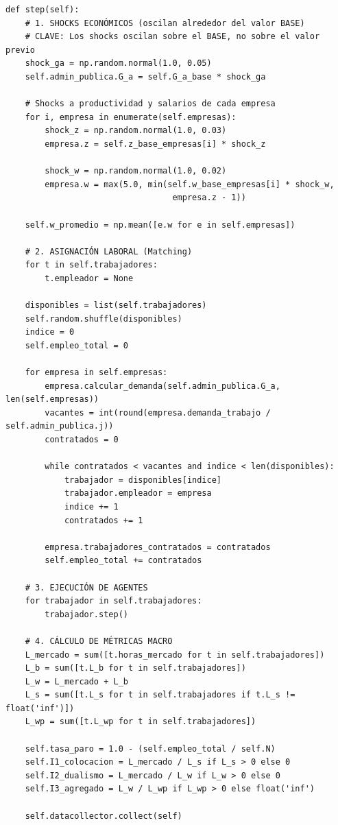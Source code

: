 \begin{verbatim}
def step(self):
    # 1. SHOCKS ECONÓMICOS (oscilan alrededor del valor BASE)
    # CLAVE: Los shocks oscilan sobre el BASE, no sobre el valor previo
    shock_ga = np.random.normal(1.0, 0.05)
    self.admin_publica.G_a = self.G_a_base * shock_ga
    
    # Shocks a productividad y salarios de cada empresa
    for i, empresa in enumerate(self.empresas):
        shock_z = np.random.normal(1.0, 0.03)
        empresa.z = self.z_base_empresas[i] * shock_z
        
        shock_w = np.random.normal(1.0, 0.02)
        empresa.w = max(5.0, min(self.w_base_empresas[i] * shock_w, 
                                  empresa.z - 1))
    
    self.w_promedio = np.mean([e.w for e in self.empresas])

    # 2. ASIGNACIÓN LABORAL (Matching)
    for t in self.trabajadores: 
        t.empleador = None
        
    disponibles = list(self.trabajadores)
    self.random.shuffle(disponibles)
    indice = 0
    self.empleo_total = 0
    
    for empresa in self.empresas:
        empresa.calcular_demanda(self.admin_publica.G_a, len(self.empresas))
        vacantes = int(round(empresa.demanda_trabajo / self.admin_publica.j))
        contratados = 0
        
        while contratados < vacantes and indice < len(disponibles):
            trabajador = disponibles[indice]
            trabajador.empleador = empresa
            indice += 1
            contratados += 1
            
        empresa.trabajadores_contratados = contratados
        self.empleo_total += contratados

    # 3. EJECUCIÓN DE AGENTES
    for trabajador in self.trabajadores:
        trabajador.step()
    
    # 4. CÁLCULO DE MÉTRICAS MACRO
    L_mercado = sum([t.horas_mercado for t in self.trabajadores])
    L_b = sum([t.L_b for t in self.trabajadores])
    L_w = L_mercado + L_b
    L_s = sum([t.L_s for t in self.trabajadores if t.L_s != float('inf')])
    L_wp = sum([t.L_wp for t in self.trabajadores])
    
    self.tasa_paro = 1.0 - (self.empleo_total / self.N)
    self.I1_colocacion = L_mercado / L_s if L_s > 0 else 0
    self.I2_dualismo = L_mercado / L_w if L_w > 0 else 0
    self.I3_agregado = L_w / L_wp if L_wp > 0 else float('inf')
    
    self.datacollector.collect(self)
\end{verbatim}


